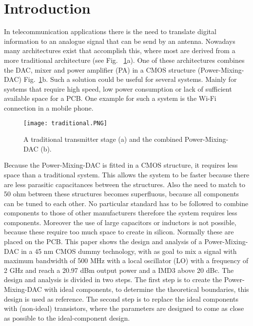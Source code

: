 \section{Introduction} \label{sec:introduction}
In telecommunication applications there is the need to translate digital information to an analogue signal that can be send by an antenna. Nowadays many architectures exist that accomplish this, where most are derived from a more traditional architecture (see Fig. ~\ref{fig:traditional}a). One of these architectures combines the DAC, mixer and power amplifier (PA) in a CMOS structure (Power-Mixing-DAC) Fig.~\ref{fig:traditional}b. Such a solution could be useful for several systems. Mainly for systems that require high speed, low power consumption or lack of sufficient available space for a PCB. One example for such a system is the Wi-Fi connection in a mobile phone.
\begin{figure}[h]
\texttt{[image: traditional.PNG]}
\caption{A traditional transmitter stage (a) and the combined Power-Mixing-DAC (b). ~\cite{powerdac}}
\label{fig:traditional}
\end{figure} 
Because the Power-Mixing-DAC is fitted in a CMOS structure, it requires less space than a traditional system. This allows the system to be faster because there are less parasitic capacitances between the structures. Also the need to match to 50 ohm between these structures becomes superfluous, because all components can be tuned to each other. No particular standard has to be followed to combine components to those of other manufacturers therefore the system requires less components. Moreover the use of large capacitors or inductors is not possible, because these require too much space to create in silicon. Normally these are placed on the PCB.
This paper shows the design and analysis of a Power-Mixing-DAC in a 45 nm CMOS dummy technology, with as goal to mix a signal with maximum bandwidth of 500 MHz with a local oscillator (LO) with a frequency of 2 GHz and reach a 20.97 dBm output power and a IMD3 above 20 dBc. The design and analysis is divided in two steps. The first step is to create the Power-Mixing-DAC with ideal components, to determine the theoretical boundaries, this design is used as reference. The second step is to replace the ideal components with (non-ideal) transistors, where the parameters are designed to come as close as possible to the ideal-component design.
